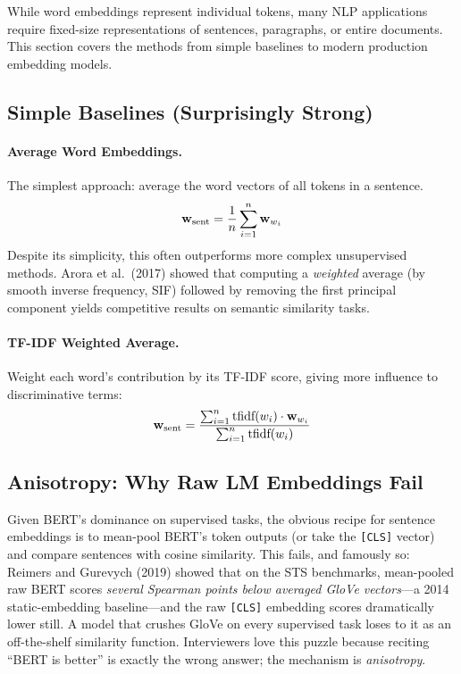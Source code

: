 While word embeddings represent individual tokens, many NLP applications
require fixed-size representations of sentences, paragraphs, or entire
documents.  This section covers the methods from simple baselines to modern
production embedding models.

\subsection{Simple Baselines (Surprisingly Strong)}

\paragraph{Average Word Embeddings.}
The simplest approach: average the word vectors of all tokens in a sentence.
\[
    \mathbf{w}_{\text{sent}} = \frac{1}{n} \sum_{i=1}^{n} \mathbf{w}_{w_i}
\]
Despite its simplicity, this often outperforms more complex unsupervised
methods.  Arora et al.\ (2017) showed that computing a \emph{weighted}
average (by smooth inverse frequency, SIF) followed by removing the first
principal component yields competitive results on semantic similarity tasks.

\paragraph{TF-IDF Weighted Average.}
Weight each word's contribution by its TF-IDF score, giving more influence to
discriminative terms:
\[
    \mathbf{w}_{\text{sent}} = \frac{\sum_{i=1}^{n}
                               \text{tfidf}(w_i) \cdot \mathbf{w}_{w_i}}
                              {\sum_{i=1}^{n} \text{tfidf}(w_i)}
\]

\subsection{Anisotropy: Why Raw LM Embeddings Fail}
\label{subsec:anisotropy}

Given BERT's dominance on supervised tasks, the obvious recipe for sentence
embeddings is to mean-pool BERT's token outputs (or take the \texttt{[CLS]}
vector) and compare sentences with cosine similarity.  This fails, and
famously so: Reimers and Gurevych (2019) showed that on the STS benchmarks,
mean-pooled raw BERT scores \emph{several Spearman points below averaged
GloVe vectors}---a 2014 static-embedding baseline---and the raw
\texttt{[CLS]} embedding scores dramatically lower still.  A model that
crushes GloVe on every supervised task loses to it as an off-the-shelf
similarity function.  Interviewers love this puzzle because reciting
``BERT is better'' is exactly the wrong answer; the mechanism is
\emph{anisotropy}.

